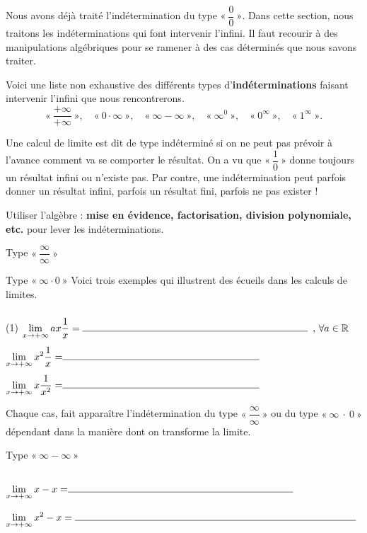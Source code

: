 \documentclass[a4paper,12pt]{article}
\begin{document}
Nous avons déjà traité l'indétermination du type $« ~\dfrac{0}{0}~»$. Dans cette section, nous traitons les indéterminations qui font intervenir l'infini. Il faut recourir à des manipulations algébriques pour se ramener à des cas déterminés que nous savons traiter.


Voici une liste non exhaustive des différents types d’{\bfseries indéterminations} faisant intervenir l'infini que nous rencontrerons.
\[
 «~\dfrac{+\infty}{+\infty}~»,\quad
«~0\cdot\infty~»,\quad
 «~\infty - \infty~»,\quad
 «~\infty^0~»,\quad
 «~0^\infty~»,\quad
 «~1^\infty~».
\]

\begin{remarque}
	\tcblower
	Une calcul de limite est dit de type indéterminé si on ne peut pas prévoir à l’avance comment va se comporter le résultat. On a vu que 
\(«~\displaystyle\dfrac{1}{0}~»\)
donne toujours un résultat infini ou n'existe pas. Par contre, une indétermination peut parfois donner un résultat infini, parfois un résultat fini, parfois ne pas exister !

Utiliser l'algèbre : {\bfseries mise en évidence, factorisation, division polynomiale, etc.} pour lever les indéterminations.
\end{remarque}
\begin{exemple}
	Type $«~\dfrac{\infty}{\infty}~»$

	\vspace{1cm}

	Type $«~\infty \cdot 0~»$
	\tcblower
	Voici trois exemples qui illustrent des écueils dans les calculs de limites.
	\begin{tasks}(1)
		\task[] $\displaystyle{\lim_{x\rightarrow +\infty}ax\dfrac{1}{x}}=\ligne{8}, \, \forall a\in \mathbb{R}$
		\task[] $\displaystyle{\lim_{x\rightarrow +\infty}x^2\dfrac{1}{x}=}\ligne{7}$
		\task[] $\displaystyle{\lim_{x\rightarrow +\infty}x\dfrac{1}{x^2}=}\ligne{7}$
	\end{tasks}
	Chaque cas, fait apparaître l'indétermination du type $«~\dfrac{\infty}{\infty}~»$ ou du type $«~\infty~\cdot~0~»$ dépendant dans la manière dont on transforme la limite. 
\end{exemple}
\begin{exemple}
	Type $«~\infty-\infty~»$
	\tcblower
	\begin{tasks}
		\task $\displaystyle{\lim_{x\rightarrow +\infty}x-x=}\ligne{8}$
		\task $\displaystyle{\lim_{x\rightarrow +\infty}x^2-x}=\ligne{10}$ 
	\end{tasks}
\end{exemple}
\end{document}
